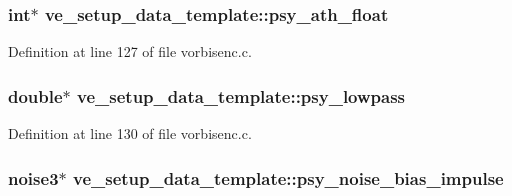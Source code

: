\subsubsection[{\texorpdfstring{psy\+\_\+ath\+\_\+float}{psy_ath_float}}]{ {\bf int}$\ast$ ve\+\_\+setup\+\_\+data\+\_\+template\+::psy\+\_\+ath\+\_\+float}\hypertarget{structve__setup__data__template_a1359dd7c84320f1350da647144689f87}{}\label{structve__setup__data__template_a1359dd7c84320f1350da647144689f87}


Definition at line 127 of file vorbisenc.\+c.

\subsubsection[{\texorpdfstring{psy\+\_\+lowpass}{psy_lowpass}}]{ double$\ast$ ve\+\_\+setup\+\_\+data\+\_\+template\+::psy\+\_\+lowpass}\hypertarget{structve__setup__data__template_ae8d4049ce7ae8ad4a8b6f739b80f56bd}{}\label{structve__setup__data__template_ae8d4049ce7ae8ad4a8b6f739b80f56bd}


Definition at line 130 of file vorbisenc.\+c.

\subsubsection[{\texorpdfstring{psy\+\_\+noise\+\_\+bias\+\_\+impulse}{psy_noise_bias_impulse}}]{ {\bf noise3}$\ast$ ve\+\_\+setup\+\_\+data\+\_\+template\+::psy\+\_\+noise\+\_\+bias\+\_\+impulse}\hypertarget{structve__setup__data__template_ae4fcd5a91d17cc208699ab25d7d0fa46}{}\label{structve__setup__data__template_ae4fcd5a91d17cc208699ab25d7d0fa46}


